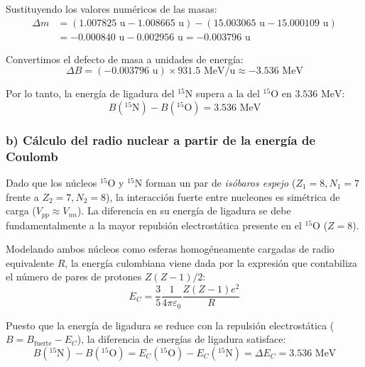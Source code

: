 \begin{problema}
Sustituyendo los valores numéricos de las masas:
\begin{align}
\Delta m &= (1.007825\text{ u} - 1.008665\text{ u}) - (15.003065\text{ u} - 15.000109\text{ u}) \nonumber \\
&= -0.000840\text{ u} - 0.002956\text{ u} = -0.003796\text{ u}
\end{align}

Convertimos el defecto de masa a unidades de energía:
\begin{equation}
\Delta B = (-0.003796\text{ u}) \times 931.5\text{ MeV/u} \approx -3.536\text{ MeV}
\end{equation}

Por lo tanto, la energía de ligadura del ${}^{15}\text{N}$ supera a la del ${}^{15}\text{O}$ en $3.536\text{ MeV}$:
\begin{equation}
B({}^{15}\text{N}) - B({}^{15}\text{O}) = 3.536\text{ MeV}
\end{equation}

\newpage

\subsubsection*{b) Cálculo del radio nuclear a partir de la energía de Coulomb}

Dado que los núcleos ${}^{15}\text{O}$ y ${}^{15}\text{N}$ forman un par de \textit{isóbaros espejo} ($Z_1 = 8, N_1 = 7$ frente a $Z_2 = 7, N_2 = 8$), la interacción fuerte entre nucleones es simétrica de carga ($V_{pp} \approx V_{nn}$). La diferencia en su energía de ligadura se debe fundamentalmente a la mayor repulsión electrostática presente en el ${}^{15}\text{O}$ ($Z = 8$).

Modelando ambos núcleos como esferas homogéneamente cargadas de radio equivalente $R$, la energía culombiana viene dada por la expresión que contabiliza el número de pares de protones $Z(Z-1)/2$:
\begin{equation}
E_C = \frac{3}{5} \frac{1}{4\pi\varepsilon_0} \frac{Z(Z-1) e^2}{R}
\end{equation}

Puesto que la energía de ligadura se reduce con la repulsión electrostática ($B = B_{\text{fuerte}} - E_C$), la diferencia de energías de ligadura satisface:
\begin{equation}
B({}^{15}\text{N}) - B({}^{15}\text{O}) = E_C({}^{15}\text{O}) - E_C({}^{15}\text{N}) = \Delta E_C = 3.536\text{ MeV}
\end{equation}


\end{problema}
